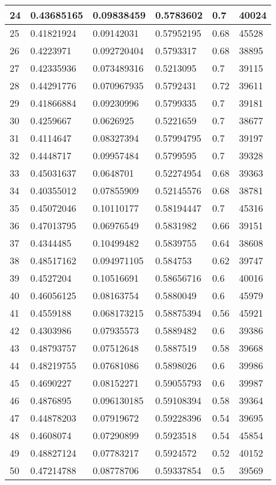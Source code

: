 \begin{longtable}{|l|l|l|l|l|l|}
24 & 0.43685165 & 0.09838459 & 0.5783602 & 0.7 & 40024 \\ \hline 
25 & 0.41821924 & 0.09142031 & 0.57952195 & 0.68 & 45528 \\ \hline 
26 & 0.4223971 & 0.092720404 & 0.5793317 & 0.68 & 38895 \\ \hline 
27 & 0.42335936 & 0.073489316 & 0.5213095 & 0.7 & 39115 \\ \hline 
28 & 0.44291776 & 0.070967935 & 0.5792431 & 0.72 & 39611 \\ \hline 
29 & 0.41866884 & 0.09230996 & 0.5799335 & 0.7 & 39181 \\ \hline 
30 & 0.4259667 & 0.0626925 & 0.5221659 & 0.7 & 38677 \\ \hline 
31 & 0.4114647 & 0.08327394 & 0.57994795 & 0.7 & 39197 \\ \hline 
32 & 0.4448717 & 0.09957484 & 0.5799595 & 0.7 & 39328 \\ \hline 
33 & 0.45031637 & 0.0648701 & 0.52274954 & 0.68 & 39363 \\ \hline 
34 & 0.40355012 & 0.07855909 & 0.52145576 & 0.68 & 38781 \\ \hline 
35 & 0.45072046 & 0.10110177 & 0.58194447 & 0.7 & 45316 \\ \hline 
36 & 0.47013795 & 0.06976549 & 0.5831982 & 0.66 & 39151 \\ \hline 
37 & 0.4344485 & 0.10499482 & 0.5839755 & 0.64 & 38608 \\ \hline 
38 & 0.48517162 & 0.094971105 & 0.584753 & 0.62 & 39747 \\ \hline 
39 & 0.4527204 & 0.10516691 & 0.58656716 & 0.6 & 40016 \\ \hline 
40 & 0.46056125 & 0.08163754 & 0.5880049 & 0.6 & 45979 \\ \hline 
41 & 0.4559188 & 0.068173215 & 0.58875394 & 0.56 & 45921 \\ \hline 
42 & 0.4303986 & 0.07935573 & 0.5889482 & 0.6 & 39386 \\ \hline 
43 & 0.48793757 & 0.07512648 & 0.5887519 & 0.58 & 39668 \\ \hline 
44 & 0.48219755 & 0.07681086 & 0.5898026 & 0.6 & 39986 \\ \hline 
45 & 0.4690227 & 0.08152271 & 0.59055793 & 0.6 & 39987 \\ \hline 
46 & 0.4876895 & 0.096130185 & 0.59108394 & 0.58 & 39364 \\ \hline 
47 & 0.44878203 & 0.07919672 & 0.59228396 & 0.54 & 39695 \\ \hline 
48 & 0.4608074 & 0.07290899 & 0.5923518 & 0.54 & 45854 \\ \hline 
49 & 0.48827124 & 0.07783217 & 0.5924572 & 0.52 & 40152 \\ \hline 
50 & 0.47214788 & 0.08778706 & 0.59337854 & 0.5 & 39569 \\ \hline 
\end{longtable}